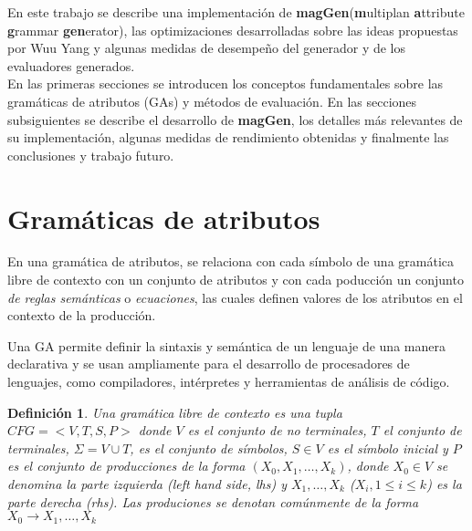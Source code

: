 \documentclass[a4paper]{article}
\newtheorem{definition}{Definición}[section]
\newcommand{\maggen}{\textbf{magGen}}
\begin{document}
En este trabajo se describe una implementación de \maggen (\textbf{m}ultiplan 
\textbf{a}ttribute \textbf{g}rammar \textbf{gen}erator), las optimizaciones desarrolladas 
sobre las ideas propuestas por Wuu Yang\cite{wuu-yang1} y algunas medidas de desempeño del
generador y de los evaluadores generados. \\

En las primeras secciones se introducen los conceptos fundamentales sobre las gramáticas de atributos (GAs) y métodos de evaluación. En las secciones subsiguientes se describe el
desarrollo de \maggen, los detalles más relevantes de su implementación, algunas medidas de
rendimiento obtenidas y finalmente las conclusiones y trabajo futuro.

\section{Gramáticas de atributos}

En una gramática de atributos, se relaciona con cada símbolo de una gramática libre de contexto con un conjunto de atributos y con cada poducción un conjunto \textit{de reglas semánticas} o \emph{ecuaciones}, las cuales definen valores de los atributos en el contexto 
de la producción.

Una GA permite definir la sintaxis y semántica de un lenguaje de una manera declarativa y
se usan ampliamente para el desarrollo de procesadores de lenguajes, como compiladores, 
intérpretes y herramientas de análisis de código.

\begin{definition}
Una gramática libre de contexto es una tupla \mbox{$CFG=<V,T,S,P>$} donde $V$ es el conjunto de no terminales, $T$ el conjunto de terminales, $\Sigma = V \cup T$, es el conjunto de símbolos, $S \in V$ es el símbolo inicial y $P$ es el conjunto de producciones de la forma
$(X_0, X_1, \ldots, X_k)$, donde $X_0 \in V$ se denomina la parte izquierda (left hand side,
lhs) y $X_1, \ldots, X_k$ ($X_i, 1 \leq i \leq k$) es la parte derecha (rhs). Las produciones se denotan comúnmente de la forma $X_0 \rightarrow X_1, \ldots, X_k$
\end{definition}
\end{document}
